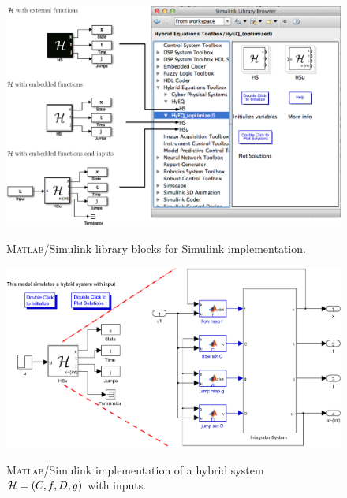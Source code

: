 \documentclass{article}
\newcommand{\matlab}{\textsc{Matlab}}
\begin{document}
\begin{figure}[ht]
  \begin{center}
    {\includegraphics[width=1\textwidth]{figures/Simulink/SimulinkimplementationMac.eps}}
\caption{\matlab{}/Simulink library blocks for Simulink implementation.}
\label{fig:Simulinklibblocks}
  \end{center}
\end{figure}

\begin{figure}[ht]
  \begin{center}
    {\includegraphics[width=.75\textwidth]{figures/Simulink/HSinput.eps}}
\caption{\matlab{}/Simulink implementation of a hybrid system $\mathcal{H} =(C,f,D,g)$ with inputs.}
\label{fig:HSinput}
  \end{center}
\end{figure}
\end{document}
